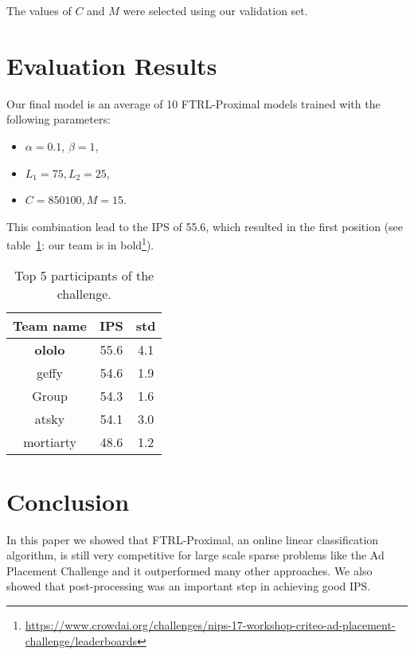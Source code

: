 \documentclass{sig-alternate}
\begin{document}
The values of $C$ and $M$ were selected using our validation set. 


\section{Evaluation Results}

Our final model is an average of 10 FTRL-Proximal models trained with the following parameters: 

\begin{itemize}
\item $\alpha=0.1$, $\beta=1$,
\item $L_1 = 75, L_2 = 25$,
\item $C = 850100, M = 15$.
\end{itemize}

This combination lead to the IPS of 55.6, which resulted in the first position
(see table~\ref{final-standings}: our team is in bold\footnote{\url{https://www.crowdai.org/challenges/nips-17-workshop-criteo-ad-placement-challenge/leaderboards}}).

\begin{table}
\centering
\begin{tabular}{|c|c|c|}
  \hline
\textbf{Team name}  &   \textbf{IPS} &   \textbf{std} \\
  \hline
\textbf{ololo}     & 55.6 & 4.1 \\
geffy     & 54.6 & 1.9 \\
Group     & 54.3 & 1.6 \\
atsky     & 54.1 & 3.0 \\
mortiarty & 48.6 & 1.2 \\
  \hline
\end{tabular}
  \caption{Top 5 participants of the challenge.}
  \label{final-standings}
\end{table}



\section{Conclusion}

In this paper we showed that FTRL-Proximal, an online linear 
classification algorithm, is still very competitive for 
large scale sparse problems like the Ad Placement Challenge and 
it outperformed many other approaches. 
We also showed that post-processing was an important step in
achieving good IPS.


{\raggedright

}
\end{document}
